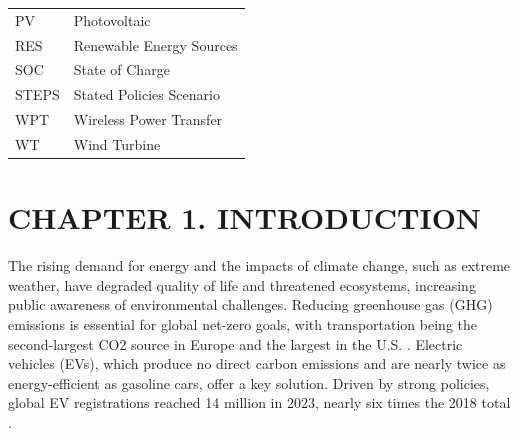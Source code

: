 \documentclass{thesis}
\begin{document}
\begin{tabular}{ l l }
    \hspace{1cm} PV & \hspace{2cm} Photovoltaic \\
    \hspace{1cm} RES & \hspace{2cm} Renewable Energy Sources \\
    \hspace{1cm} SOC & \hspace{2cm} State of Charge \\
    \hspace{1cm} STEPS & \hspace{2cm} Stated Policies Scenario \\
    \hspace{1cm} WPT & \hspace{2cm} Wireless Power Transfer \\
    \hspace{1cm} WT & \hspace{2cm} Wind Turbine \\

    
\end{tabular}  
    \newpage

{\let\oldnumberline\numberline
    \renewcommand{\numberline}{Figure~\oldnumberline}
        \listoffigures}
\newpage

{\let\oldnumberline\numberline
    \renewcommand{\numberline}{Table~\oldnumberline}
        \listoftables}
\newpage


    \section*{CHAPTER 1. INTRODUCTION} 

\setcounter{section}{1} 
    \setcounter{subsection}{0}
        \setcounter{figure}{0}
            \setcounter{table}{0}

The rising demand for energy and the impacts of climate change, such as extreme weather, have degraded quality of life and threatened ecosystems, increasing public awareness of environmental challenges. Reducing greenhouse gas (GHG) emissions is essential for global net-zero goals, with transportation being the second-largest CO2 source in Europe and the largest in the U.S. \cite{VanFan2018}. Electric vehicles (EVs), which produce no direct carbon emissions and are nearly twice as energy-efficient as gasoline cars, offer a key solution. Driven by strong policies, global EV registrations reached 14 million in 2023, nearly six times the 2018 total \cite{global_ev_outlook_2024}.
\end{document}

